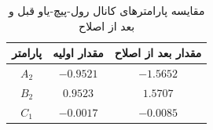 \vspace{1.5cm}
\begin{table}[H]
	\begin{center}
		\begin{tabular}{ccc}\hline
			پارامتر & مقدار اولیه  & مقدار بعد از اصلاح
			\\ \hline
			$A_2$  & $-0.9521$ & $-1.5652$ \\
			$B_2$  & $0.9523$ & $1.5707$ \\ 
			$C_1$  & $-0.0017$ & $-0.0085$ \\ \hline
		\end{tabular}
	\end{center}
	\caption {مقايسه پارامترهای کانال رول-پیچ-یاو قبل و بعد از اصلاح}
\end{table}
